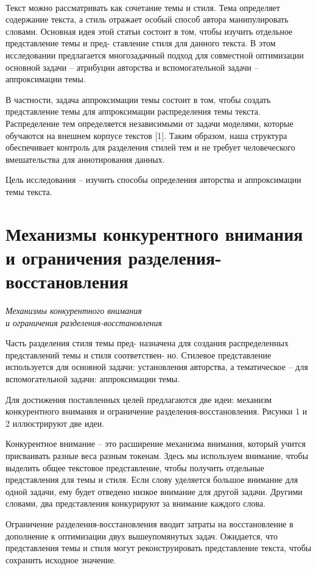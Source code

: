 \documentclass{article}
\begin{document}
\paragraph*{} Текст можно рассматривать как сочетание темы и стиля. Тема определяет содержание текста, а стиль отражает особый способ 
автора манипулировать словами. Основная 
идея этой статьи состоит в том, чтобы изучить отдельное представление темы и пред- ставление стиля для данного текста. 
В этом исследовании предлагается многозадачный подход для совместной оптимизации основной задачи – атрибуции 
авторства и вспомогательной задачи – аппроксимации темы.
\par В частности, задача аппроксимации 
темы состоит в том, чтобы создать представление темы для аппроксимации распределения темы текста. 
Распределение тем определяется независимыми от задачи моделями, которые обучаются на внешнем корпусе текстов [1]. 
Таким образом, наша структура обеспечивает контроль для разделения стилей тем и не требует человеческого вмешательства 
для аннотирования данных.
\par Цель исследования – изучить способы определения авторства и аппроксимации темы текста.

\section{Механизмы конкурентного внимания\\{и ограничения разделения-восстановления}}
\begin{center}
\emph{Механизмы конкурентного внимания}\\
\emph{и ограничения разделения-восстановления}
\end{center}
\par Часть разделения стиля темы пред- назначена для создания распределенных 
представлений темы и стиля соответствен- но. Стилевое представление используется 
для основной задачи: установления авторства, а тематическое – для вспомогательной 
задачи: аппроксимации темы.
\par Для достижения поставленных целей 
предлагаются две идеи: механизм конкурентного внимания и ограничение разделения-восстановления. Рисунки 1 и 2 иллюстрируют две идеи. 
\par Конкурентное внимание – это расширение механизма внимания, который учится присваивать разные веса разным токенам. 
Здесь мы используем внимание, чтобы выделить общее текстовое представление, чтобы получить отдельные представления для темы и стиля. 
Если слову уделяется большое внимание для одной задачи, ему будет отведено низкое внимание для другой задачи. 
Другими словами, два представления конкурируют за внимание каждого слова.
\par Ограничение разделения-восстановления вводит затраты на восстановление в дополнение к оптимизации двух вышеупомянутых задач. Ожидается, что представления 
темы и стиля могут реконструировать представление текста, чтобы сохранить исходное значение.
\end{document}
